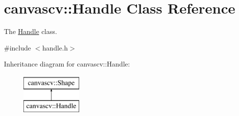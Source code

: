 \hypertarget{classcanvascv_1_1Handle}{}\section{canvascv\+:\+:Handle Class Reference}
\label{classcanvascv_1_1Handle}


The \hyperlink{classcanvascv_1_1Handle}{Handle} class.  




{\ttfamily \#include $<$handle.\+h$>$}

Inheritance diagram for canvascv\+:\+:Handle\+:\begin{figure}[H]
\begin{center}
\leavevmode
\includegraphics[height=2.000000cm]{classcanvascv_1_1Handle}
\end{center}
\end{figure}
